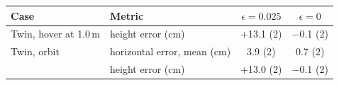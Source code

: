 \begin{tabular}{llcc}
\toprule
Case & Metric & $\epsilon = 0.025$ & $\epsilon = 0$ \\
\midrule
Twin, hover at 1.0\,m & height error (cm) & +13.1 (2) & $-$0.1 (2) \\
Twin, orbit & horizontal error, mean (cm) & 3.9 (2) & 0.7 (2) \\
 & height error (cm) & +13.0 (2) & $-$0.1 (2) \\
\bottomrule
\end{tabular}
